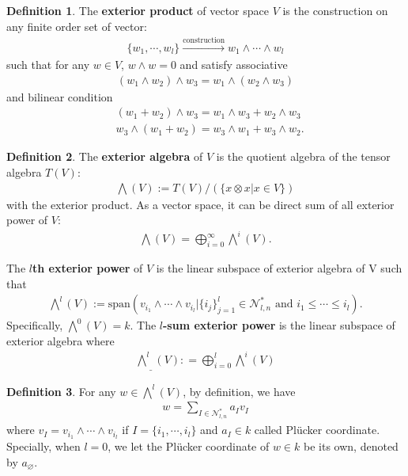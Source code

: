 \documentclass[10pt,UTF8]{article}
\theoremstyle{definition}
\renewcommand{\emptyset}{\varnothing}
\newtheorem{definition}{Definition}[section]
\begin{document}
\begin{definition}
  The \textbf{exterior product}  of vector space $V$ is the construction on any finite order set of vector:
  \begin{align*}
    \{w_1,\cdots,w_l\} \stackrel{\text{construction}}{\longrightarrow} w_1\wedge \cdots \wedge w_l
  \end{align*}
  such that for any $w\in V$, $w \wedge w = 0$ and satisfy associative 
  \begin{align*}
    (w_1\wedge w_2) \wedge w_3 = w_1\wedge (w_2 \wedge w_3)
  \end{align*}
  and bilinear condition 
  \begin{align*}
    &(w_1+w_2) \wedge w_3 = w_1\wedge w_3 +w_2\wedge w_3\\
    &w_3 \wedge (w_1+w_2)  = w_3\wedge w_1 +w_3\wedge w_2.
  \end{align*}
\end{definition}

\begin{definition}
  The \textbf{exterior algebra} of $V$ is the quotient algebra of the tensor algebra $T(V)$:
  \begin{align*}
    \bigwedge(V) := T(V)/(\{x\otimes x|x\in V\})
  \end{align*}
  with the exterior product.
  As a vector space, it can be direct sum of all exterior power of $V$:
  \begin{align*}
    \bigwedge(V) = \bigoplus_{i=0}^{\infty} \bigwedge^i(V).
  \end{align*}

  The \textbf{$l$th exterior power} of $V$ is the linear subspace of exterior algebra of V such that
  \begin{align*}
    \bigwedge^l(V) := \text{span}(v_{i_1}\wedge\cdots\wedge v_{i_l}|\text{$\{i_j\}_{j=1}^l\in \mathcal{N}^*_{l,n}$ and $i_1\le\cdots\le i_l$}).
  \end{align*}
  Specifically, $\bigwedge^0(V)=k$.
  The \textbf{$l$-sum exterior power} is the linear subspace of exterior algebra where 
  \begin{align*}
    \underline{\bigwedge^l}(V): = \bigoplus_{i=0}^{l} \bigwedge^i(V)
  \end{align*}
\end{definition}

\begin{definition}
  For any $w\in \bigwedge^l(V)$, by definition, we have 
\begin{align*}
  w = \sum_{I\in \mathcal{N}^*_{l,n}} a_Iv_I
\end{align*}
where $v_I =v_{i_1}\wedge \cdots \wedge v_{i_l}$ if $I=\{i_1,\cdots,i_l\}$ and $a_I\in k$ called Plücker coordinate. Specially, when $l=0$, we let the Plücker coordinate of $w\in k$ be its own, denoted by
$a_{\emptyset} $.
\end{definition}
\end{document}
